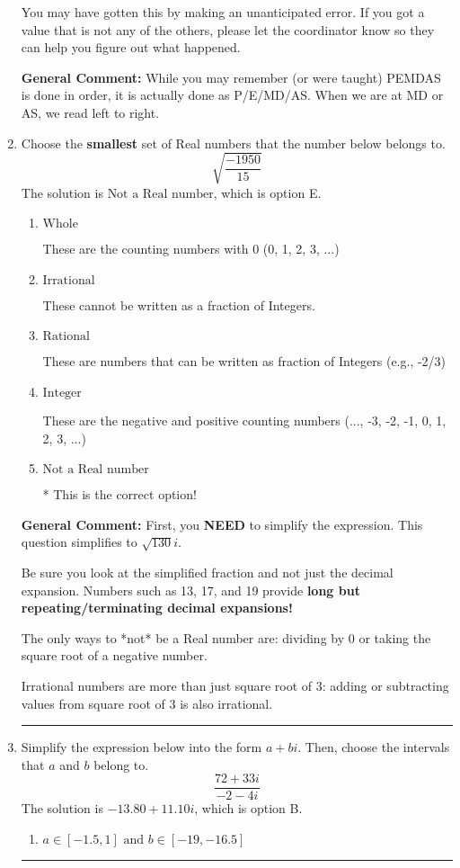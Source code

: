 \documentclass{extbook}[14pt]
\newcommand{\litem}[1]{\item #1

\rule{\textwidth}{0.4pt}}
\begin{document}
\begin{enumerate}
{\begin{enumerate}[label=\Alph*.]
 You may have gotten this by making an unanticipated error. If you got a value that is not any of the others, please let the coordinator know so they can help you figure out what happened.
\end{enumerate}

\textbf{General Comment:} While you may remember (or were taught) PEMDAS is done in order, it is actually done as P/E/MD/AS. When we are at MD or AS, we read left to right.
}
\litem{
Choose the \textbf{smallest} set of Real numbers that the number below belongs to.
\[ \sqrt{\frac{-1950}{15}} \]The solution is \( \text{Not a Real number} \), which is option E.\begin{enumerate}[label=\Alph*.]
\item \( \text{Whole} \)

These are the counting numbers with 0 (0, 1, 2, 3, ...)
\item \( \text{Irrational} \)

These cannot be written as a fraction of Integers.
\item \( \text{Rational} \)

These are numbers that can be written as fraction of Integers (e.g., -2/3)
\item \( \text{Integer} \)

These are the negative and positive counting numbers (..., -3, -2, -1, 0, 1, 2, 3, ...)
\item \( \text{Not a Real number} \)

* This is the correct option!
\end{enumerate}

\textbf{General Comment:} First, you \textbf{NEED} to simplify the expression. This question simplifies to $\sqrt{130} i$. 
 
 Be sure you look at the simplified fraction and not just the decimal expansion. Numbers such as 13, 17, and 19 provide \textbf{long but repeating/terminating decimal expansions!} 
 
 The only ways to *not* be a Real number are: dividing by 0 or taking the square root of a negative number. 
 
 Irrational numbers are more than just square root of 3: adding or subtracting values from square root of 3 is also irrational.
}
\litem{
Simplify the expression below into the form $a+bi$. Then, choose the intervals that $a$ and $b$ belong to.
\[ \frac{72 + 33 i}{-2 - 4 i} \]The solution is \( -13.80  + 11.10 i \), which is option B.\begin{enumerate}[label=\Alph*.]
\item \( a \in [-1.5, 1] \text{ and } b \in [-19, -16.5] \)


\end{enumerate}}
\end{enumerate}
\end{document}
